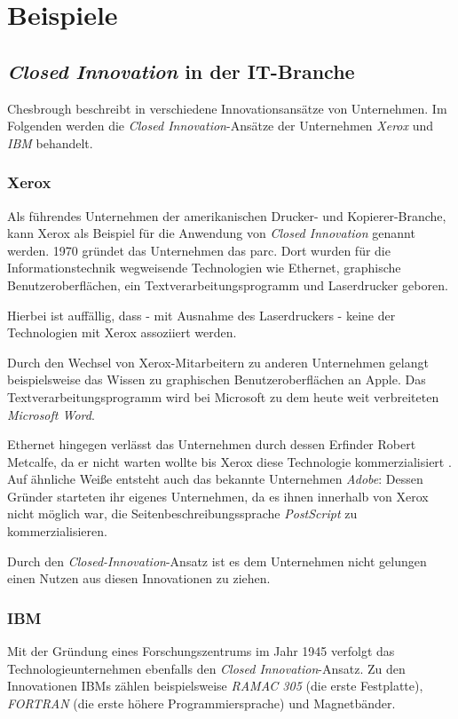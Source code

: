\section{Beispiele}\label{sec:beispiele}

\subsection{\textit{Closed Innovation} in der IT-Branche}\label{sec:beispiele-unternehmen}
Chesbrough beschreibt in \cite{chesbrough2003} verschiedene Innovationsansätze von Unternehmen.
Im Folgenden werden die \textit{Closed Innovation}-Ansätze der Unternehmen \textit{Xerox} und \textit{IBM} behandelt.

\subsubsection{Xerox \cite[1\psqq]{chesbrough2003}}
Als führendes Unternehmen der amerikanischen Drucker- und Kopierer-Branche,
kann Xerox als Beispiel für die Anwendung von \textit{Closed Innovation} genannt werden.
1970 gründet das Unternehmen das \ac{parc}.
Dort wurden für die Informationstechnik wegweisende Technologien wie
Ethernet, graphische Benutzeroberflächen, ein Textverarbeitungsprogramm und Laserdrucker geboren.

Hierbei ist auffällig, dass - mit Ausnahme des Laserdruckers - keine der Technologien mit Xerox
assoziiert werden.

Durch den Wechsel von Xerox-Mitarbeitern zu anderen Unternehmen
gelangt beispielsweise das Wissen zu graphischen Benutzeroberflächen an Apple.
Das Textverarbeitungsprogramm wird bei Microsoft zu dem heute weit verbreiteten \textit{Microsoft Word}.

Ethernet hingegen verlässt das Unternehmen durch dessen Erfinder Robert Metcalfe,
da er nicht warten wollte bis Xerox diese Technologie kommerzialisiert \cite[81]{chesbrough2003}.
Auf ähnliche Weiße entsteht auch das bekannte Unternehmen \textit{Adobe}:
Dessen Gründer starteten ihr eigenes Unternehmen,
da es ihnen innerhalb von Xerox nicht möglich war,
die Seitenbeschreibungssprache \textit{PostScript} zu kommerzialisieren.

Durch den \textit{Closed-Innovation}-Ansatz ist es dem Unternehmen nicht gelungen einen Nutzen aus diesen Innovationen zu ziehen.

\newpage
\subsubsection{IBM \cite[93\psqq]{chesbrough2003}}
Mit der Gründung eines Forschungszentrums im Jahr 1945 verfolgt das Technologieunternehmen ebenfalls den \textit{Closed Innovation}-Ansatz.
Zu den Innovationen IBMs zählen beispielsweise
\textit{RAMAC 305} (die erste Festplatte),
\textit{FORTRAN} (die erste höhere Programmiersprache) und
Magnetbänder.

